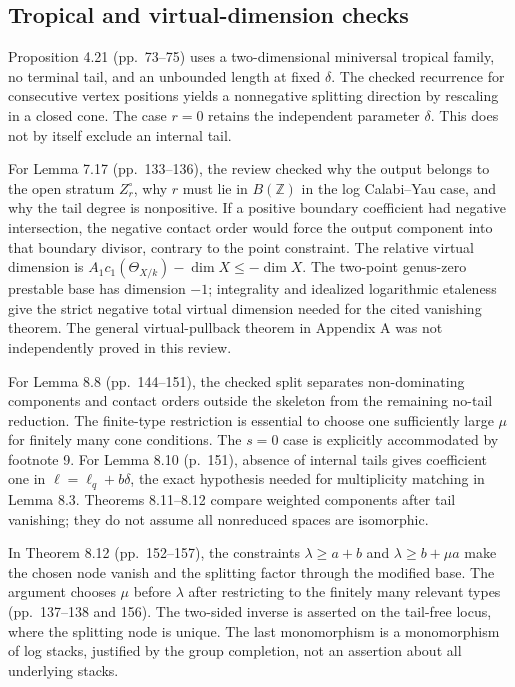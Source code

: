 \documentclass[10pt]{article}
\begin{document}
\subsection*{Tropical and virtual-dimension checks}
Proposition 4.21 (pp. 73–75) uses a two-dimensional miniversal tropical family, no terminal tail, and an unbounded length at fixed \(\delta\). The checked recurrence for consecutive vertex positions yields a nonnegative splitting direction by rescaling in a closed cone. The case \(r=0\) retains the independent parameter \(\delta\). This does not by itself exclude an internal tail.\par
For Lemma 7.17 (pp. 133–136), the review checked why the output belongs to the open stratum \(Z_r^\circ\), why \(r\) must lie in \(B(\mathbb Z)\) in the log Calabi–Yau case, and why the tail degree is nonpositive. If a positive boundary coefficient had negative intersection, the negative contact order would force the output component into that boundary divisor, contrary to the point constraint. The relative virtual dimension is \(A_1c_1(\Theta_{X/k})-\dim X\leq-\dim X\). The two-point genus-zero prestable base has dimension \(-1\); integrality and idealized logarithmic etaleness give the strict negative total virtual dimension needed for the cited vanishing theorem. The general virtual-pullback theorem in Appendix A was not independently proved in this review.\par
For Lemma 8.8 (pp. 144–151), the checked split separates non-dominating components and contact orders outside the skeleton from the remaining no-tail reduction. The finite-type restriction is essential to choose one sufficiently large \(\mu\) for finitely many cone conditions. The \(s=0\) case is explicitly accommodated by footnote 9. For Lemma 8.10 (p. 151), absence of internal tails gives coefficient one in \(\ell=\ell_q+b\delta\), the exact hypothesis needed for multiplicity matching in Lemma 8.3. Theorems 8.11–8.12 compare weighted components after tail vanishing; they do not assume all nonreduced spaces are isomorphic.\par
In Theorem 8.12 (pp. 152–157), the constraints \(\lambda\geq a+b\) and \(\lambda\geq b+\mu a\) make the chosen node vanish and the splitting factor through the modified base. The argument chooses \(\mu\) before \(\lambda\) after restricting to the finitely many relevant types (pp. 137–138 and 156). The two-sided inverse is asserted on the tail-free locus, where the splitting node is unique. The last monomorphism is a monomorphism of log stacks, justified by the group completion, not an assertion about all underlying stacks.\par
\end{document}
